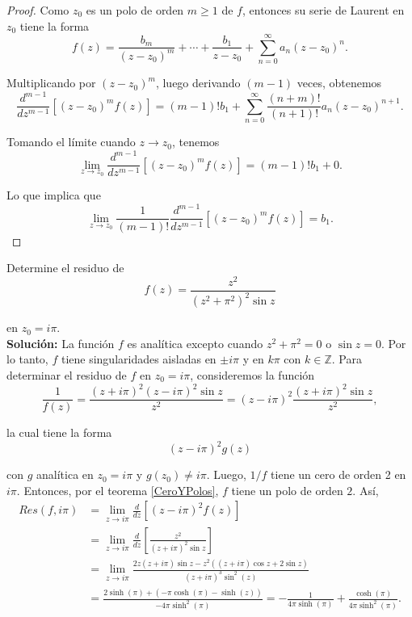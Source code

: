 \begin{proof}
Como $z_0$ es un polo de orden $m\geq 1$ de $f$, entonces su serie de Laurent en $z_0$ tiene la forma
$$f(z) = \frac{b_m}{(z-z_0)^m} + \cdots + \frac{b_1}{z-z_0} + \sum_{n=0}^{\infty} a_n (z-z_0)^n.$$

Multiplicando por $(z-z_0)^m$, luego derivando $(m-1)$ veces, obtenemos
$$\frac{d^{m-1}}{dz^{m-1}}[(z-z_0)^m f(z)] = (m-1)! b_1 + \sum_{n=0}^{\infty} \frac{(n+m)!}{(n+1)!} a_n (z-z_0)^{n+1}.$$

Tomando el límite cuando $z\to z_0$, tenemos
$$\lim_{z\to z_0}  \frac{d^{m-1}}{dz^{m-1}}[(z-z_0)^m f(z)] = (m-1)! b_1 + 0.$$

Lo que implica que
$$\lim_{z\to z_0} \frac{1}{(m-1)!} \frac{d^{m-1}}{dz^{m-1}}[(z-z_0)^m f(z)] = b_1.$$
\end{proof}


\begin{ejemplo}
Determine el residuo de 
$$f(z) = \frac{z^2}{(z^2+\pi^2)^2 \sin z}$$

en $z_0 = i\pi$.
\\

\textbf{Solución:} La función $f$ es analítica excepto cuando $z^2 + \pi^2 = 0$ o $\sin z = 0$. Por lo tanto, $f$ tiene singularidades aisladas en $\pm i \pi$ y en $k\pi$ con $k \in \mathbb{Z}$. Para determinar el residuo de $f$ en $z_0 = i\pi$, consideremos la función
$$\frac{1}{f(z)} = \frac{(z+i\pi)^2 (z-i\pi)^2 \sin z}{z^2} = (z-i\pi)^2 \frac{(z+i\pi)^2 \sin z}{z^2},$$

la cual tiene la forma
$$(z-i\pi)^2 g(z)$$

con $g$ analítica en $z_0= i\pi $ y $g(z_0) \neq i\pi$. Luego, $1/f$ tiene un cero de orden 2 en $i\pi$. Entonces, por el teorema \ref{CeroYPolos}, $f$ tiene un polo de orden $2$. Así,
\begin{align*}
    Res(f,i\pi) &= \lim_{z\to i\pi} \frac{d}{dz} [(z-i\pi)^2 f(z)] \\
    &= \lim_{z\to i\pi} \frac{d}{dz} \left[\frac{z^2}{(z+i\pi)^2 \sin z}\right]  \\
    &= \lim_{z\to i\pi} \frac{2z(z+i\pi)\sin z - z^2 ((z+i\pi) \cos z + 2\sin z)}{(z+i\pi)^3 \sin^2(z)} \\
    &= \frac{2\sinh(\pi) + (-\pi \cosh(\pi) - \sinh(z))}{-4\pi \sinh^2(\pi)} = - \frac{1}{4\pi \sinh(\pi)} + \frac{\cosh(\pi)}{4\pi \sinh^2(\pi)}.
\end{align*}

\end{ejemplo}

